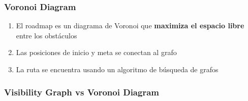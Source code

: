 \begin{frame}
	\frametitle{Voronoi Diagram}
	
	\begin{enumerate}
		\item El roadmap es un diagrama de Voronoi que {\bf maximiza el espacio libre} entre los obstáculos
		\item Las posiciones de inicio y meta se conectan al grafo
		\item La ruta se encuentra usando un algoritmo de búsqueda de grafos
	\end{enumerate}
	
	\begin{figure}
		\hspace{1em}
		\hspace{1em}
	\end{figure}
	
\end{frame}


\begin{frame}
	\frametitle{Visibility Graph vs Voronoi Diagram}
	
	
\end{frame}

